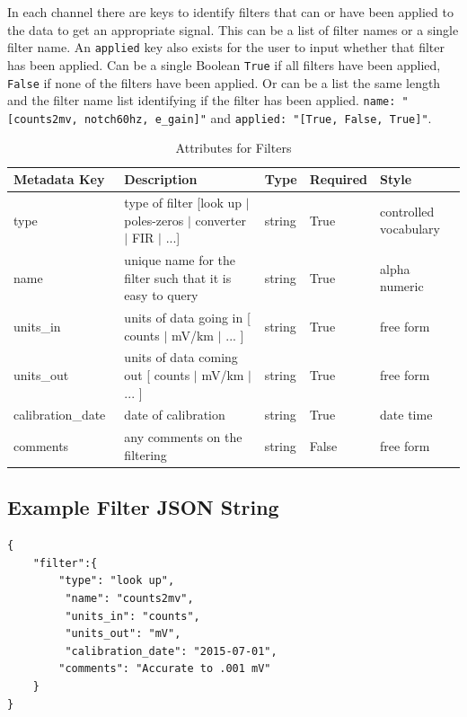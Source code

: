 \documentclass{article}
\begin{document}
In each channel there are keys to identify filters that can or have been applied to the data to get an appropriate signal.  This can be a list of filter names or a single filter name.  An \verb|applied| key also exists for the user to input whether that filter has been applied.  Can be a single Boolean \verb|True| if all filters have been applied, \verb|False| if none of the filters have been applied.  Or can be a list the same length and the filter name list identifying if the filter has been applied.  \verb|name: "[counts2mv, notch60hz, e_gain]"| and \verb|applied: "[True, False, True]"|. 

\begin{table}[htb!]
    \caption[Attributes for Filter]{Attributes for Filters}
    \begin{tabular}{|l|p{2.75in}|l|l|p{.95in}|}
    	\hline
    	\textbf{Metadata Key} & \textbf{Description} & \textbf{Type} & \textbf{Required} & \textbf{Style}\\ \hline
        type\ & type of filter [look up $|$ poles-zeros $|$ converter $|$ FIR $|$ ...]& string &  True  & controlled vocabulary \\ \hline
        name\ & unique name for the filter such that it is easy to query & string & True  & alpha numeric\\ \hline
        units\_in\ & units of data going in [ counts $|$ mV/km $|$ ... ] & string & True  & free form\\ \hline
        units\_out\ & units of data coming out [ counts $|$ mV/km $|$ ... ] & string & True  &  free form \\ \hline
        calibration\_date\ & date of calibration & string &  True  &  date time\\ \hline
        comments\ & any comments on the filtering & string &  False  &  free form \\ \hline
    \end{tabular}
    \label{tab:filter}
\end{table}

\subsection{Example Filter JSON String} 

\begin{verbatim}
{
    "filter":{
        "type": "look up",
         "name": "counts2mv",
         "units_in": "counts",
         "units_out": "mV",
         "calibration_date": "2015-07-01",
        "comments": "Accurate to .001 mV"
    }
}
\end{verbatim}
\end{document}
